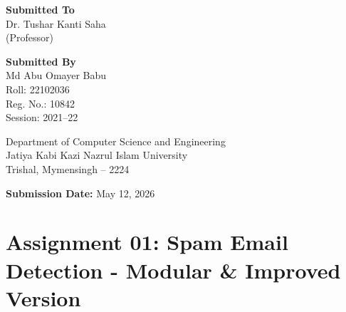 \documentclass[14pt,a4paper]{report}
\begin{document}
\begin{titlepage}
\begin{center}
\begin{center}
\begin{minipage}{0.45\textwidth}
\centering
{\fontsize{14pt}{18pt}\selectfont \textbf{Submitted To}}\\[0.4cm]

{\fontsize{12pt}{15pt}\selectfont
Dr. Tushar Kanti Saha\\
(Professor)
}
\end{minipage}
\hspace{1cm}
\begin{minipage}{0.45\textwidth}
\centering
{\fontsize{14pt}{18pt}\selectfont \textbf{Submitted By}}\\[0.4cm]

{\fontsize{12pt}{15pt}\selectfont
Md Abu Omayer Babu\\
Roll: 22102036\\
Reg. No.: 10842\\
Session: 2021--22
}
\end{minipage}
\end{center}

\vspace{1.4cm}

{\fontsize{12pt}{15pt}\selectfont
Department of Computer Science and Engineering\\
Jatiya Kabi Kazi Nazrul Islam University\\
Trishal, Mymensingh -- 2224
}

\vspace{1.3cm}

{\fontsize{12pt}{15pt}\selectfont
\textbf{Submission Date:} May 12, 2026
}

\vspace{0.5cm}

\end{center}
\end{titlepage}

\tableofcontents
\newpage

\chapter{Assignment 01: Spam Email Detection - Modular \& Improved Version}
\end{document}

